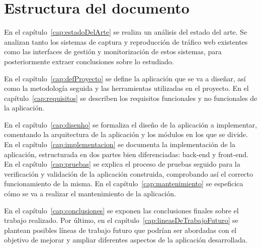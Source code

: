 \section{Estructura del documento}

En el capítulo~\ref{cap:estadoDelArte} se realiza un análisis del estado del arte.
Se analizan tanto los sistemas de captura y reproducción de tráfico web existentes como las interfaces de gestión y monitorización de estos sistemas, para posteriormente extraer conclusiones sobre lo estudiado.

En el capítulo~\ref{cap:defProyecto} se define la aplicación que se va a diseñar, así como la metodología seguida y las herramientas utilizadas en el proyecto.
En el capítulo~\ref{cap:requisitos} se describen los requisitos funcionales y no funcionales de la aplicación.

En el capítulo~\ref{cap:disenho} se formaliza el diseño de la aplicación a implementar, comentando la arquitectura de la aplicación y los módulos en los que se divide.
En el capítulo~\ref{cap:implementacion} se documenta la implementación de la aplicación, estructurada en dos partes bien diferenciadas: \gls{back-end} y \gls{front-end}.
En el capítulo~\ref{cap:pruebas} se explica el proceso de pruebas seguido para la verificación y validación de la aplicación construida, comprobando así el correcto funcionamiento de la misma.
En el capítulo~\ref{cap:mantenimiento} se espeficica cómo se va a realizar el mantenimiento de la aplicación.

En el capítulo~\ref{cap:conclusiones} se exponen las conclusiones finales sobre el trabajo realizado.
Por último, en el capítulo~\ref{cap:lineasDeTrabajoFuturo} se plantean posibles líneas de trabajo futuro que podrían ser abordadas con el objetivo de mejorar y ampliar diferentes aspectos de la aplicación desarrollada.
